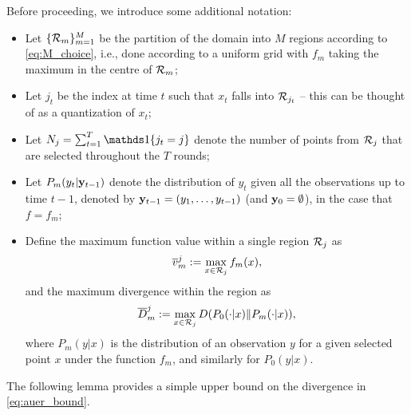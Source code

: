 \documentclass[english,onecolumn,final,11pt]{IEEEtran} %
\newcommand{\Dbar}{\overline{D}}
\begin{document}
Before proceeding, we introduce some additional notation:
\begin{itemize}
	\item Let $\{\mathcal{R}_m\}_{m=1}^M$ be the partition of the domain into $M$ regions according to \eqref{eq:M_choice}, i.e., done according to a uniform grid with $f_m$ taking the maximum in the centre of $\mathcal{R}_m$;
	\item Let $j_t$ be the index at time $t$ such that $x_t$ falls into $\mathcal{R}_{j_t}$ -- this can be thought of as a quantization of $x_t$;
	\item Let $N_j = \sum_{t=1}^T \openone\{j_t = j\}$ denote the number of points from $\mathcal{R}_j$ that are selected throughout the $T$ rounds;
	\item Let $P_m(y_t|\mathbf{y}_{t-1})$ denote the distribution of $y_t$ given all the observations up to time $t-1$, denoted by $\mathbf{y}_{t-1} = (y_1,\dotsc,y_{t-1})$ (and $\mathbf{y}_0 = \emptyset$), in the case that $f = f_m$;
	\item Define the maximum function value within a single region $\mathcal{R}_j$ as
	\begin{equation}
		\overline{v}_m^j := \max_{x \in \mathcal{R}_j} f_m(x), \label{eq:vbar}
	\end{equation}
	and the maximum divergence within the region as
	\begin{equation}
		\Dbar_m^j := \max_{x \in \Rc_j} D( P_0(\cdot|x) \| P_m(\cdot|x) ), \label{eq:Dbar}
	\end{equation}
	where $P_m(y|x)$ is the distribution of an observation $y$ for a given selected point $x$ under the function $f_m$, and similarly for $P_0(y|x)$.
\end{itemize}

\noindent The following lemma provides a simple upper bound on the divergence in \eqref{eq:auer_bound}. 
\end{document}
